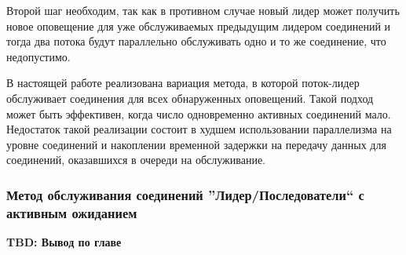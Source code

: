 Второй шаг необходим, так как в противном случае новый лидер может получить новое оповещение для уже обслуживаемых предыдущим лидером соединений и тогда два потока будут параллельно обслуживать одно и то же соединение, что недопустимо.

В настоящей работе реализована вариация метода, в которой поток-лидер обслуживает соединения для всех обнаруженных оповещений. Такой подход может быть эффективен, когда число одновременно активных соединений мало. Недостаток такой реализации состоит в худшем использовании параллелизма на уровне соединений и накоплении временной задержки на передачу данных для соединений, оказавшихся в очереди на обслуживание.

\subsubsection{Метод обслуживания соединений ''Лидер/Последователи`` с активным ожиданием}\label{chapter31:NonBlockingLF}

\chapterconclusion

\textbf{TBD: Вывод по главе}
